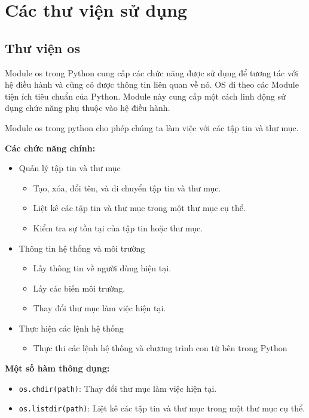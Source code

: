 \documentclass[a4paper]{article}
\begin{document}
\section{Các thư viện sử dụng}
\subsection{Thư viện os}
Module os trong Python cung cấp các chức năng được sử dụng để tương tác với hệ điều hành và cũng có được thông tin liên quan về nó. OS đi theo các Module tiện ích tiêu chuẩn của Python. Module này cung cấp một cách linh động sử dụng chức năng phụ thuộc vào hệ điều hành.

Module os trong python cho phép chúng ta làm việc với các tập tin và thư mục.

\textbf{Các chức năng chính:}
\begin{itemize}
    \item Quản lý tập tin và thư mục
    \begin{itemize}
        \item Tạo, xóa, đổi tên, và di chuyển tập tin và thư mục.
        \item Liệt kê các tập tin và thư mục trong một thư mục cụ thể.
        \item Kiểm tra sự tồn tại của tập tin hoặc thư mục.
    \end{itemize}
    \item Thông tin hệ thống và môi trường
    \begin{itemize}
        \item Lấy thông tin về người dùng hiện tại.
        \item Lấy các biến môi trường.
        \item Thay đổi thư mục làm việc hiện tại.
    \end{itemize}
    \item Thực hiện các lệnh hệ thống
    \begin{itemize}
        \item Thực thi các lệnh hệ thống và chương trình con từ bên trong Python
    \end{itemize}
\end{itemize}

\textbf{Một số hàm thông dụng:}
\begin{itemize}
    \item \texttt{os.chdir(path)}: Thay đổi thư mục làm việc hiện tại.
    \item \texttt{os.listdir(path)}: Liệt kê các tập tin và thư mục trong một thư mục cụ thể.
\end{itemize}
\end{document}
